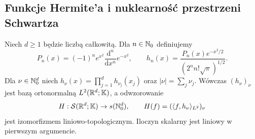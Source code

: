\subsection{Funkcje Hermite'a i nuklearność przestrzeni Schwartza}
\label{sec:hermite-supp23}

\begin{lemat}
\label{lem:hermite-schwartz23}
Niech $d\ge1$ będzie liczbą całkowitą. Dla $n\in\mathbb N_0$ definiujemy
\[
 P_n(x)=(-1)^n e^{x^2}\frac{\mathrm d^n}{\mathrm dx^n}e^{-x^2},
 \qquad h_n(x)=\frac{P_n(x)e^{-x^2/2}}{(2^n n!\sqrt\pi)^{1/2}}.
\]
Dla $\nu\in\mathbb N_0^d$ niech $h_\nu(x)=\prod_{j=1}^d h_{\nu_j}(x_j)$
oraz $|\nu|=\sum_j\nu_j$. Wówczas $(h_\nu)_\nu$
jest bazą ortonormalną $L^2(\mathbb R^d;\mathbb K)$, a odwzorowanie
\[
 H:\mathcal S(\mathbb R^d;\mathbb K)\to s(\mathbb N_0^d),\qquad
 H(f)=(\langle f,h_\nu\rangle_{L^2})_\nu
\]
jest izomorfizmem liniowo-topologicznym. Iloczyn skalarny
jest liniowy w pierwszym argumencie.
\end{lemat}
